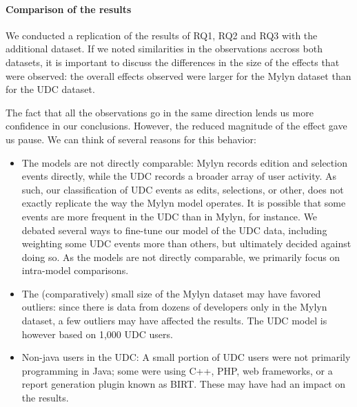 \documentclass[times]{smrauth}
\begin{document}

\paragraph{Comparison of the results}

We conducted a replication of the results of RQ1, RQ2 and RQ3 with the additional dataset. If we noted similarities in the observations accross both datasets, it is important to discuss the differences in the size of the effects that were observed: the overall effects observed were larger for the Mylyn dataset than for the UDC dataset.

The fact that all the observations go in the same direction lends us more confidence in our conclusions. However, the reduced magnitude of the effect gave us pause. We can think of several reasons for this behavior:

\begin{itemize}
\item The models are not directly comparable: Mylyn records edition and selection events directly, while the UDC records a broader array of user activity. As such, our classification of UDC events as edits, selections, or other, does not exactly replicate the way the Mylyn model operates. It is possible that some events are more frequent in the UDC than in Mylyn, for instance. We debated several ways to fine-tune our model of the UDC data, including weighting some UDC events more than others, but ultimately decided against doing so. As the models are not directly comparable, we primarily focus on intra-model comparisons.
\item The (comparatively) small size of the Mylyn dataset may have favored outliers: since there is data from dozens of developers only in the Mylyn dataset, a few outliers may have affected the results. The UDC model is however based on 1,000 UDC users.
\item Non-java users in the UDC: A small portion of UDC users were not primarily programming in Java; some were using C++, PHP, web frameworks, or a report generation plugin known as BIRT. These may have had an impact on the results.
\end{itemize}
\end{document}

